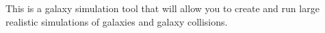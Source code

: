 This is a galaxy simulation tool that will allow you to create and run large realistic simulations of galaxies and galaxy collisions. 